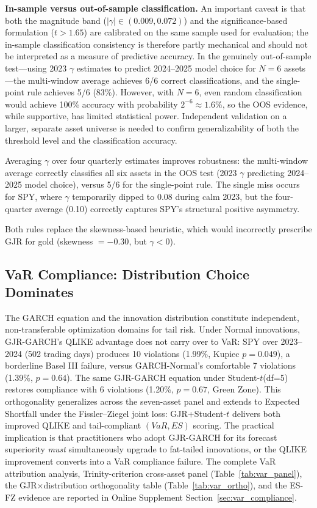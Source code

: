\textbf{In-sample versus out-of-sample classification.} An important caveat is that both the magnitude band ($|\gamma| \in (0.009, 0.072)$) and the significance-based formulation ($t > 1.65$) are calibrated on the same sample used for evaluation; the in-sample classification consistency is therefore partly mechanical and should not be interpreted as a measure of predictive accuracy. In the genuinely out-of-sample test---using 2023 $\gamma$ estimates to predict 2024--2025 model choice for $N = 6$ assets---the multi-window average achieves 6/6 correct classifications, and the single-point rule achieves 5/6 (83\%). However, with $N = 6$, even random classification would achieve 100\% accuracy with probability $2^{-6} \approx 1.6\%$, so the OOS evidence, while supportive, has limited statistical power. Independent validation on a larger, separate asset universe is needed to confirm generalizability of both the threshold level and the classification accuracy.

Averaging $\gamma$ over four quarterly estimates improves robustness: the multi-window average correctly classifies all six assets in the OOS test (2023 $\gamma$ predicting 2024--2025 model choice), versus 5/6 for the single-point rule. The single miss occurs for SPY, where $\gamma$ temporarily dipped to 0.08 during calm 2023, but the four-quarter average (0.10) correctly captures SPY's structural positive asymmetry.

Both rules replace the skewness-based heuristic, which would incorrectly prescribe GJR for gold (skewness $= -0.30$, but $\gamma < 0$).


\subsection{VaR Compliance: Distribution Choice Dominates}
\label{sec:var_note_body}

The GARCH equation and the innovation distribution constitute independent, non-transferable optimization domains for tail risk. Under Normal innovations, GJR-GARCH's QLIKE advantage does not carry over to VaR: SPY over 2023--2024 (502 trading days) produces 10 violations (1.99\%, Kupiec $p = 0.049$), a borderline Basel III failure, versus GARCH-Normal's comfortable 7 violations (1.39\%, $p = 0.64$). The same GJR-GARCH equation under Student-$t$(df=5) restores compliance with 6 violations (1.20\%, $p = 0.67$, Green Zone). This orthogonality generalizes across the seven-asset panel and extends to Expected Shortfall under the Fissler--Ziegel joint loss: GJR+Student-$t$ delivers both improved QLIKE and tail-compliant $(V\!aR, ES)$ scoring. The practical implication is that practitioners who adopt GJR-GARCH for its forecast superiority \textit{must} simultaneously upgrade to fat-tailed innovations, or the QLIKE improvement converts into a VaR compliance failure. The complete VaR attribution analysis, Trinity-criterion cross-asset panel (Table~\ref{tab:var_panel}), the GJR$\times$distribution orthogonality table (Table~\ref{tab:var_ortho}), and the ES-FZ evidence are reported in Online Supplement Section~\ref{sec:var_compliance}.

